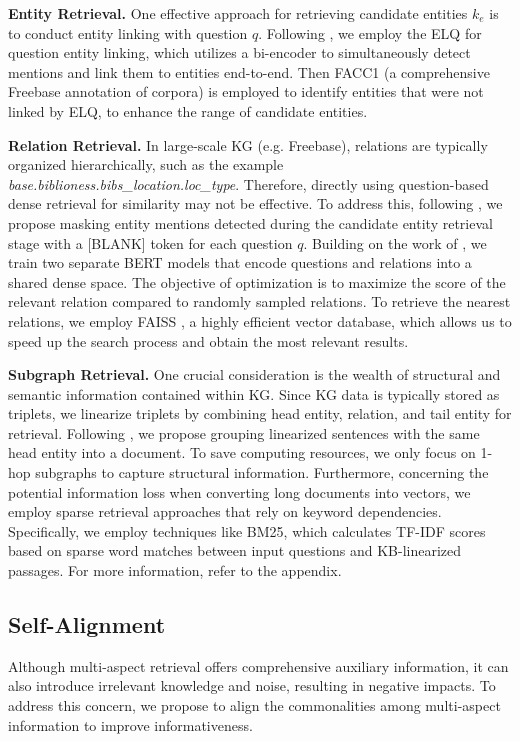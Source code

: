 \textbf{Entity Retrieval.} 
One effective approach for retrieving candidate entities $k_e$ is to conduct entity linking with question $q$. Following \citet{GMT-KBQA}, we employ the ELQ \cite{ELQ} for question entity linking, which utilizes a bi-encoder to simultaneously detect mentions and link them to entities end-to-end. Then FACC1 \cite{facc1} (a comprehensive Freebase annotation of corpora) is employed to identify entities that were not linked by ELQ, to enhance the range of candidate entities.

\textbf{Relation Retrieval.}
In large-scale KG (e.g. Freebase), relations are typically organized hierarchically, such as the example \textit{base.biblioness.bibs\_location.loc\_type}. Therefore, directly using question-based dense retrieval for similarity may not be effective. To address this, following \citet{GMT-KBQA}, we propose masking entity mentions detected during the candidate entity retrieval stage with a [BLANK] token for each question $q$. Building on the work of \citet{GMT-KBQA,CBR-KBQA}, we train two separate BERT models that encode questions and relations into a shared dense space. The objective of optimization is to maximize the score of the relevant relation compared to randomly sampled relations. To retrieve the nearest relations, we employ FAISS \cite{douze2024faiss}, a highly efficient vector database, which allows us to speed up the search process and obtain the most relevant results. 

\textbf{Subgraph Retrieval.}
One crucial consideration is the wealth of structural and semantic information contained within KG. 
Since KG data is typically stored as triplets, we linearize triplets by combining head entity, relation, and tail entity for retrieval. Following \cite{decaf}, we propose grouping linearized sentences with the same head entity into a document. To save computing resources, we only focus on 1-hop subgraphs to capture structural information.
Furthermore, concerning the potential information loss when converting long documents into vectors, we employ sparse retrieval approaches that rely on keyword dependencies. Specifically, we employ techniques like BM25, which calculates TF-IDF scores based on sparse word matches between input questions and KB-linearized passages. For more information, refer to the appendix.


\subsection{Self-Alignment} \label{sec:Self-Alignment}
Although multi-aspect retrieval offers comprehensive auxiliary information, it can also introduce irrelevant knowledge and noise, resulting in negative impacts. To address this concern, we propose to align the commonalities among multi-aspect information to improve informativeness.

